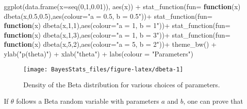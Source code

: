 \documentclass[
]{book}
\newenvironment{Shaded}{\begin{snugshade}}{\end{snugshade}}
\newcommand{\AttributeTok}[1]{\textcolor[rgb]{0.77,0.63,0.00}{#1}}
\newcommand{\ControlFlowTok}[1]{\textcolor[rgb]{0.13,0.29,0.53}{\textbf{#1}}}
\newcommand{\DecValTok}[1]{\textcolor[rgb]{0.00,0.00,0.81}{#1}}
\newcommand{\FloatTok}[1]{\textcolor[rgb]{0.00,0.00,0.81}{#1}}
\newcommand{\FunctionTok}[1]{\textcolor[rgb]{0.00,0.00,0.00}{#1}}
\newcommand{\NormalTok}[1]{#1}
\newcommand{\SpecialCharTok}[1]{\textcolor[rgb]{0.00,0.00,0.00}{#1}}
\newcommand{\StringTok}[1]{\textcolor[rgb]{0.31,0.60,0.02}{#1}}
\begin{document}
\begin{Shaded}
\begin{Highlighting}[]
\FunctionTok{ggplot}\NormalTok{(}\FunctionTok{data.frame}\NormalTok{(}\AttributeTok{x=}\FunctionTok{seq}\NormalTok{(}\DecValTok{0}\NormalTok{,}\DecValTok{1}\NormalTok{,}\FloatTok{0.01}\NormalTok{)), }\FunctionTok{aes}\NormalTok{(x)) }\SpecialCharTok{+}
  \FunctionTok{stat\_function}\NormalTok{(}\AttributeTok{fun=} \ControlFlowTok{function}\NormalTok{(x) }\FunctionTok{dbeta}\NormalTok{(x,}\FloatTok{0.5}\NormalTok{,}\FloatTok{0.5}\NormalTok{),}\FunctionTok{aes}\NormalTok{(}\AttributeTok{colour=}\StringTok{"a = 0.5, b = 0.5"}\NormalTok{))}\SpecialCharTok{+}
     \FunctionTok{stat\_function}\NormalTok{(}\AttributeTok{fun=} \ControlFlowTok{function}\NormalTok{(x) }\FunctionTok{dbeta}\NormalTok{(x,}\DecValTok{1}\NormalTok{,}\DecValTok{1}\NormalTok{),}\FunctionTok{aes}\NormalTok{(}\AttributeTok{colour=}\StringTok{"a = 1, b = 1"}\NormalTok{))}\SpecialCharTok{+}
    \FunctionTok{stat\_function}\NormalTok{(}\AttributeTok{fun=} \ControlFlowTok{function}\NormalTok{(x) }\FunctionTok{dbeta}\NormalTok{(x,}\DecValTok{1}\NormalTok{,}\DecValTok{3}\NormalTok{),}\FunctionTok{aes}\NormalTok{(}\AttributeTok{colour=}\StringTok{"a = 1, b = 3"}\NormalTok{))}\SpecialCharTok{+}
    \FunctionTok{stat\_function}\NormalTok{(}\AttributeTok{fun=} \ControlFlowTok{function}\NormalTok{(x) }\FunctionTok{dbeta}\NormalTok{(x,}\DecValTok{5}\NormalTok{,}\DecValTok{2}\NormalTok{),}\FunctionTok{aes}\NormalTok{(}\AttributeTok{colour=}\StringTok{"a = 5, b = 2"}\NormalTok{))}\SpecialCharTok{+}
  \FunctionTok{theme\_bw}\NormalTok{() }\SpecialCharTok{+} \FunctionTok{ylab}\NormalTok{(}\StringTok{"p(theta)"}\NormalTok{) }\SpecialCharTok{+} \FunctionTok{xlab}\NormalTok{(}\StringTok{"theta"}\NormalTok{) }\SpecialCharTok{+} \FunctionTok{labs}\NormalTok{(}\AttributeTok{colour =} \StringTok{"Parameters"}\NormalTok{)}
\end{Highlighting}
\end{Shaded}

\begin{figure}

{\centering \texttt{[image: BayesStats\_files/figure-latex/dbeta-1]} 

}

\caption{Density of the Beta distribution for various choices of parameters.}\label{fig:dbeta}
\end{figure}

If \(\theta\) follows a Beta random variable with parameters \(a\) and \(b\), one can prove that
\end{document}
